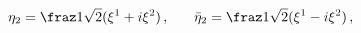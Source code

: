 \begin{equation}
\eta_2=\fraz 1{\sqrt{2}}(\xi^1+i\xi^2)\,,\phantom{+\xi3}
{\bar\eta}_2=\fraz 1{\sqrt{2}}(\xi^1-i\xi^2)\,,
\end{equation}

